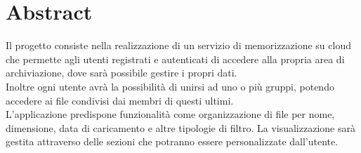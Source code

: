 \chapter*{Abstract}

Il progetto consiste nella realizzazione di un servizio di 
memorizzazione su cloud che permette agli utenti registrati e 
autenticati di accedere alla propria area di archiviazione, dove sarà 
possibile gestire i propri dati.\\ Inoltre ogni utente avrà la 
possibilità di unirsi ad uno o più gruppi, potendo accedere ai file 
condivisi dai membri di questi ultimi.\\
L’applicazione predispone funzionalità come organizzazione di file per 
nome, dimensione, data di caricamento e altre tipologie di filtro. 
La visualizzazione sarà gestita attraverso delle sezioni che potranno 
essere personalizzate dall’utente.